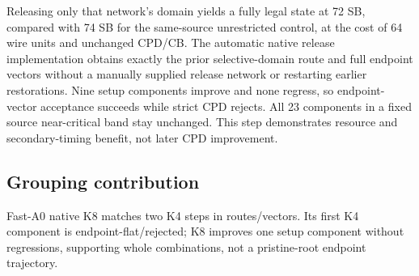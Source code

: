\documentclass[conference,10pt]{IEEEtran}
\begin{document}
Releasing only that network's domain yields a fully legal state at 72 SB, compared with 74 SB for the same-source unrestricted control, at the cost of 64 wire units and unchanged CPD/CB. The automatic native release implementation obtains exactly the prior selective-domain route and full endpoint vectors without a manually supplied release network or restarting earlier restorations. Nine setup components improve and none regress, so endpoint-vector acceptance succeeds while strict CPD rejects. All 23 components in a fixed source near-critical band stay unchanged. This step demonstrates resource and secondary-timing benefit, not later CPD improvement.

\subsection{Grouping contribution}
Fast-A0 native K8 matches two K4 steps in routes/vectors. Its first K4 component is endpoint-flat/rejected; K8 improves one setup component without regressions, supporting whole combinations, not a pristine-root endpoint trajectory.
\end{document}
